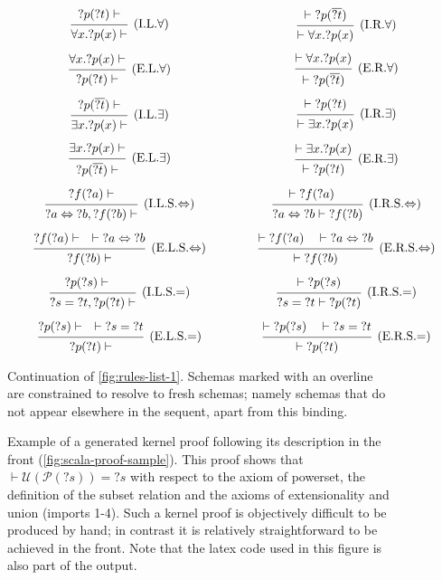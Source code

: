 \begin{figure}[H]
  $$\arraycolsep=0.75cm\def\arraystretch{3}\begin{array}{c c}
  \frule{{?p}({?t}) \vdash}{\forall x. {?p}(x) \vdash}{I.L.$\forall$} & \frule{\vdash {?p}(\overline{?t})}{\vdash \forall x. {?p}(x)}{I.R.$\forall$} \\
  \frule{\forall x. {?p}(x) \vdash}{{?p}({?t}) \vdash}{E.L.$\forall$} & \frule{\vdash \forall x. {?p}(x)}{\vdash {?p}(\overline{?t})}{E.R.$\forall$} \\
  \frule{{?p}(\overline{?t}) \vdash}{\exists x. {?p}(x) \vdash}{I.L.$\exists$} & \frule{\vdash {?p}({?t})}{\vdash \exists x. {?p}(x)}{I.R.$\exists$} \\
  \frule{\exists x. {?p}(x) \vdash}{{?p}(\overline{?t}) \vdash}{E.L.$\exists$} & \frule{\vdash \exists x. {?p}(x)}{\vdash {?p}({?t})}{E.R.$\exists$} \\
  \frule{{?f}({?a}) \vdash}{{?a} \Leftrightarrow {?b}, {?f}({?b}) \vdash}{I.L.S.$\Leftrightarrow$} & \frule{\vdash {?f}({?a}) \quad}{{?a} \Leftrightarrow {?b} \vdash {?f}({?b})}{I.R.S.$\Leftrightarrow$} \\
  \frule{{?f}({?a}) \vdash \quad \vdash {?a} \Leftrightarrow {?b}}{{?f}({?b}) \vdash}{E.L.S.$\Leftrightarrow$} & \frule{\vdash {?f}({?a}) \quad \vdash {?a} \Leftrightarrow {?b}}{\vdash {?f}({?b})}{E.R.S.$\Leftrightarrow$} \\
  \frule{{?p}({?s}) \vdash \quad}{{?s} = {?t}, {?p}({?t}) \vdash}{I.L.S.$=$} & \frule{\vdash {?p}({?s})}{{?s} = {?t} \vdash {?p}({?t})}{I.R.S.$=$} \\
  \frule{{?p}({?s}) \vdash \quad \vdash {?s} = {?t}}{{?p}({?t}) \vdash}{E.L.S.$=$} & \frule{\vdash {?p}({?s}) \quad \vdash {?s} = {?t}}{\vdash {?p}({?t})}{E.R.S.$=$}
  \end{array}$$
  \caption[Rules (2)]{Continuation of \autoref{fig:rules-list-1}. Schemas marked with an overline are constrained to resolve to fresh schemas; namely schemas that do not appear elsewhere in the sequent, apart from this binding.}
  \label{fig:rules-list-2}
\end{figure}



\begin{figure}[H]
  \centering
  
  \caption[Sample proof (kernel)]{Example of a generated kernel proof following its description in the front (\autoref{fig:scala-proof-sample}). This proof shows that $\vdash \mathcal{U}(\mathcal{P}({?s})) = {?s}$ with respect to the axiom of powerset, the definition of the subset relation and the axioms of extensionality and union (imports 1-4). Such a kernel proof is objectively difficult to be produced by hand; in contrast it is relatively straightforward to be achieved in the front. Note that the latex code used in this figure is also part of the output.}
  \label{fig:lisa-proof-sample}
\end{figure}
